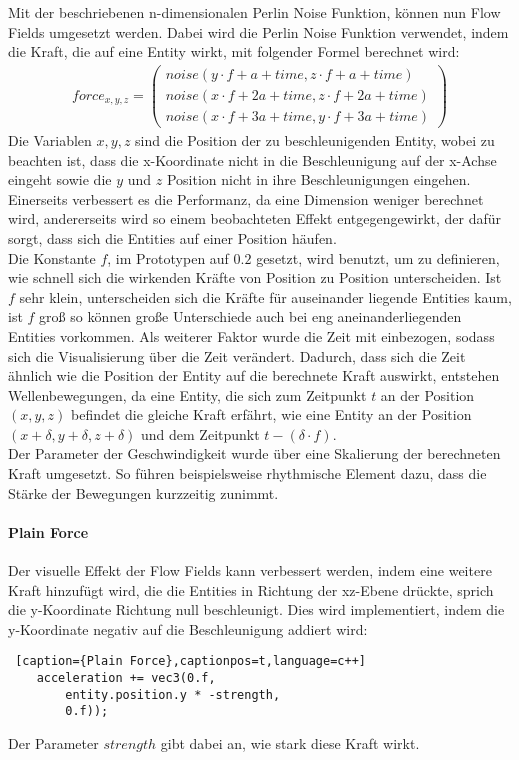 \documentclass[11pt,a4paper]{article}
\begin{document}
\vspace{10pt}
\noindent
Mit der beschriebenen n-dimensionalen Perlin Noise Funktion, können nun Flow Fields umgesetzt werden. Dabei wird die Perlin Noise Funktion verwendet, indem die Kraft, die auf eine Entity wirkt, mit folgender Formel berechnet wird:
\begin{align}
force_{x,y,z} = \left(
\begin{array}{c}
noise(y \cdot f + a + time, z \cdot f + a + time) \\
noise(x \cdot f + 2a + time, z \cdot f + 2a + time) \\
noise(x \cdot f + 3a + time, y \cdot f + 3a + time)
\end{array}
\right)
\end{align}
\noindent
Die Variablen $x, y, z$ sind die Position der zu beschleunigenden Entity, wobei zu beachten ist, dass die x-Koordinate nicht in die Beschleunigung auf der x-Achse eingeht sowie die $y$ und $z$ Position nicht in ihre Beschleunigungen eingehen. Einerseits verbessert es die Performanz, da eine Dimension weniger berechnet wird, andererseits wird so einem beobachteten Effekt entgegengewirkt, der dafür sorgt, dass sich die Entities auf einer Position häufen.\\
Die Konstante $f$, im Prototypen auf $0.2$ gesetzt, wird benutzt, um zu definieren, wie schnell sich die wirkenden Kräfte von Position zu Position unterscheiden. Ist $f$ sehr klein, unterscheiden sich die Kräfte für auseinander liegende Entities kaum, ist $f$ groß so können große Unterschiede auch bei eng aneinanderliegenden Entities vorkommen. Als weiterer Faktor wurde die Zeit mit einbezogen, sodass sich die Visualisierung über die Zeit verändert. Dadurch, dass sich die Zeit ähnlich wie die Position der Entity auf die berechnete Kraft auswirkt, entstehen Wellenbewegungen, da eine Entity, die sich zum Zeitpunkt $t$ an der Position $(x, y, z)$ befindet die gleiche Kraft erfährt, wie eine Entity an der Position $(x+\delta, y+\delta, z+\delta)$ und dem Zeitpunkt $t-(\delta \cdot f)$.\\
Der Parameter der Geschwindigkeit wurde über eine Skalierung der berechneten Kraft umgesetzt. So führen beispielsweise rhythmische Element dazu, dass die Stärke der Bewegungen kurzzeitig zunimmt.

\paragraph{Plain Force}
Der visuelle Effekt der Flow Fields kann verbessert werden, indem eine weitere Kraft hinzufügt wird, die die Entities in Richtung der xz-Ebene drückte, sprich die y-Koordinate Richtung null beschleunigt. Dies wird implementiert, indem die y-Koordinate negativ auf die Beschleunigung addiert wird:
\begin{lstlisting} [caption={Plain Force},captionpos=t,language=c++]
	acceleration += vec3(0.f,
		entity.position.y * -strength,
		0.f));
\end{lstlisting}
\noindent
Der Parameter $strength$ gibt dabei an, wie stark diese Kraft wirkt.\\
\end{document}
